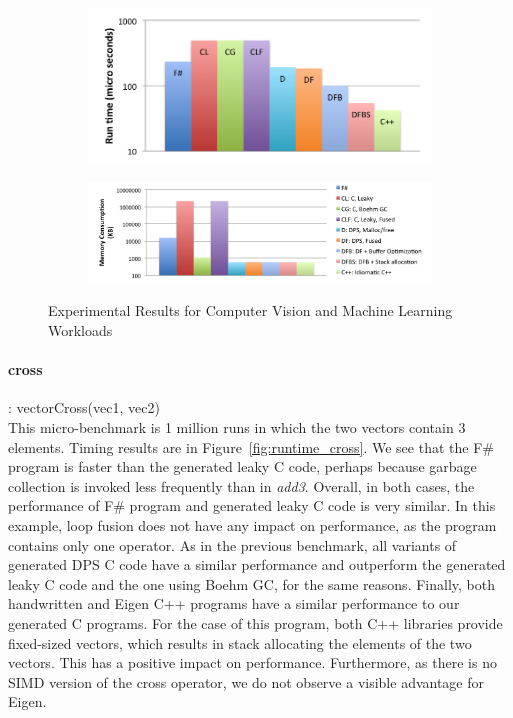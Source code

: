 \begin{figure}[t]
\begin{subfigure}[t]{.58\textwidth}
\label{fig:mem_gmm}
\end{subfigure}
\begin{subfigure}[t]{.38\textwidth}
\includegraphics[width=\columnwidth]{results/ht_runtime.png}
\label{fig:runtime_ht}
\end{subfigure}
\hfill
\begin{subfigure}[t]{.58\textwidth}
\includegraphics[width=\columnwidth]{results/ht_mem.png}
\label{fig:mem_ht}
\end{subfigure}
\caption{Experimental Results for Computer Vision and Machine Learning Workloads}
\end{figure}

\paragraph{cross}: vectorCross(vec1, vec2)\\
This micro-benchmark is 1 million runs in which the two vectors contain 3 elements.  Timing results are in Figure~\ref{fig:runtime_cross}. 
We see that the F\# program is faster than the generated leaky C code, perhaps because garbage collection is invoked less frequently than in \emph{add3}. Overall, in both cases, the performance of F\# program and generated leaky C code is very similar.
In this example, loop fusion does not have any impact on performance, as the program contains only one operator. 
As in the previous benchmark, all variants of generated DPS C code have a similar performance and outperform the generated leaky C code and the one using Boehm GC, for the same reasons.
Finally, both handwritten and Eigen C++ programs have a similar performance to our generated C programs. For the case of this program, both C++ libraries provide fixed-sized vectors, which results in stack allocating the elements of the two vectors. This has a positive impact on performance. Furthermore, as there is no SIMD version of the cross operator, we do not observe a visible advantage for Eigen.

